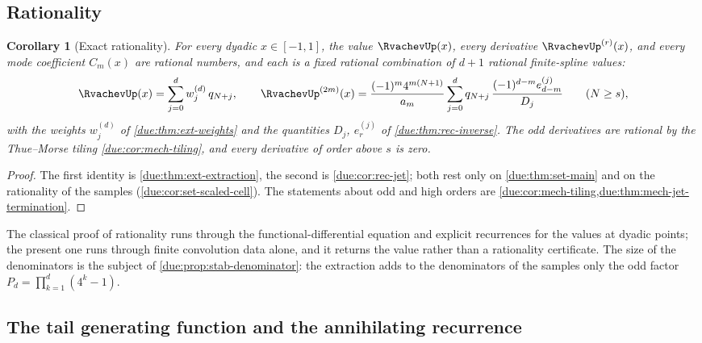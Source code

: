 \documentclass[11pt,oneside]{article}
\theoremstyle{plain}
\newtheorem{corollary}[theorem]{Corollary}
\theoremstyle{definition}
\theoremstyle{remark}
\newcommand{\upn}[1]{\RvachevUp_{#1}}
\newcommand{\am}[1]{a_{#1}}                                 %
\newcommand{\Cr}[2]{C_{#1}\!\left(#2\right)}                %
\newcommand{\qn}[1]{q_{#1}}                                 %
\newcommand{\Wrow}[2]{w^{(#1)}_{#2}}                        %
\begin{document}
\subsection{Rationality}
\label{due:sec:main-rational}

\begin{corollary}[Exact rationality]
\label{due:cor:main-rational}
For every dyadic $x\in[-1,1]$, the value $\RvachevUp(x)$, every derivative
$\RvachevUp^{(r)}(x)$, and every mode coefficient $\Cr{m}{x}$ are rational
numbers, and each is a fixed rational combination of $d+1$ rational
finite-spline values:
\begin{equation}
 \RvachevUp(x)=\sum_{j=0}^{d}\Wrow{d}{j}\,\qn{N+j},
 \qquad
 \RvachevUp^{(2m)}(x)
 =\frac{(-1)^{m}4^{m(N+1)}}{\am{m}}
  \sum_{j=0}^{d}\qn{N+j}\,\frac{(-1)^{d-m}e^{(j)}_{d-m}}{D_{j}}
 \qquad(N\ge s),
 \label{due:eq:main-rational}
\end{equation}
with the weights $\Wrow{d}{j}$ of \cref{due:thm:ext-weights} and the
quantities $D_{j}$, $e^{(j)}_{r}$ of \cref{due:thm:rec-inverse}.  The odd
derivatives are rational by the Thue--Morse tiling
\cref{due:cor:mech-tiling}, and every derivative of order above $s$ is
zero.
\end{corollary}

\begin{proof}
The first identity is \cref{due:thm:ext-extraction}, the second is
\cref{due:cor:rec-jet}; both rest only on \cref{due:thm:set-main} and on the
rationality of the samples (\cref{due:cor:set-scaled-cell}).  The
statements about odd and high orders are
\cref{due:cor:mech-tiling,due:thm:mech-jet-termination}.
\end{proof}

The classical proof of rationality \cite{arias1982,arias2018} runs
through the functional-differential equation and explicit recurrences for
the values at dyadic points; the present one runs through finite
convolution data alone, and it returns the value rather than a rationality
certificate.  The size of the denominators is the subject of
\cref{due:prop:stab-denominator}: the extraction adds to the denominators
of the samples only the odd factor $P_{d}=\prod_{k=1}^{d}(4^{k}-1)$.

\subsection{The tail generating function and the annihilating recurrence}
\label{due:sec:main-generating}
\end{document}
